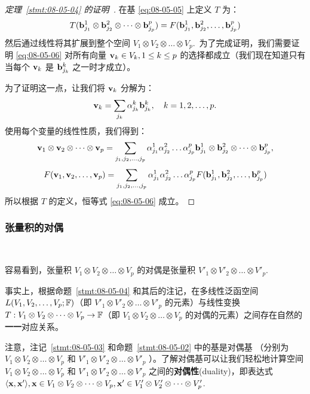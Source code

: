 \begin{proof}[\normalfont\heiti 定理~\ref{stmt:08-05-04} 的证明~\nopunct]
在基 \eqref{eq:08-05-05} 上定义 $T$ 为：
$$ T(\mathbf{b}^{1}_{j_1} \otimes \mathbf{b}^{2}_{j_2} \otimes \dots \otimes \mathbf{b}^{p}_{j_p}) = F(\mathbf{b}^{1}_{j_1}, \mathbf{b}^{2}_{j_2}, \dots, \mathbf{b}^{p}_{j_p}) $$
然后通过线性将其扩展到整个空间 $V_1 \otimes V_2 \otimes \dots \otimes V_p$.~为了完成证明，我们需要证明 \eqref{eq:08-05-06} 对所有向量 $\mathbf{v}_k \in V_k, 1 \le k \le p$ 的选择都成立（我们现在知道只有当每个 $\mathbf{v}_k$ 是 $\mathbf{b}^{k}_{j_k}$ 之一时才成立）。

为了证明这一点，让我们将 $\mathbf{v}_k$ 分解为：
$$ \mathbf{v}_k = \sum_{j_k} \alpha^{k}_{j_k} \mathbf{b}^{k}_{j_k}, \quad k = 1, 2, \dots, p .$$
使用每个变量的线性性质，我们得到：
$$ \mathbf{v}_1 \otimes \mathbf{v}_2 \otimes \dots \otimes \mathbf{v}_p = \sum_{j_1, j_2, \dots, j_p} \alpha^{1}_{j_1} \alpha^{2}_{j_2} \dots \alpha^{p}_{j_p} \mathbf{b}^{1}_{j_1} \otimes \mathbf{b}^{2}_{j_2} \otimes \dots \otimes \mathbf{b}^{p}_{j_p} ,$$
$$ F(\mathbf{v}_1, \mathbf{v}_2, \dots, \mathbf{v}_p) = \sum_{j_1, j_2, \dots, j_p} \alpha^{1}_{j_1} \alpha^{2}_{j_2} \dots \alpha^{p}_{j_p} F(\mathbf{b}^{1}_{j_1}, \mathbf{b}^{2}_{j_2}, \dots, \mathbf{b}^{p}_{j_p}) $$
所以根据 $T$ 的定义，恒等式 \eqref{eq:08-05-06} 成立。\end{proof}

\subsubsection{张量积的对偶}\label{sec:08-05-02-02}~~

容易看到，张量积 $V_1 \otimes V_2 \otimes \dots \otimes V_p$ 的对偶是张量积 $V'_1 \otimes V'_2 \otimes \dots \otimes V'_p$.

事实上，根据命题~\ref{stmt:08-05-04} 和其后的注记，在多线性泛函空间 $L(V_1,V_2,\dots,V_p;\mathbb{F})$（即 $V'_1 \otimes V'_2 \otimes \dots \otimes V'_p$ 的元素）与线性变换 $T : V_1 \otimes V_2 \otimes \dots \otimes V_p \to \mathbb{F}$（即 $V_1 \otimes V_2 \otimes \dots \otimes V_p$ 的对偶的元素）之间存在自然的\textbf{一一}对应关系。

注意，注记~\ref{stmt:08-05-03} 和命题~\ref{stmt:08-05-02} 中的基是对偶基 （分别为 $V_1 \otimes V_2 \otimes \dots \otimes V_p$ 和 $V'_1 \otimes V'_2 \otimes \dots \otimes V'_p$ ）。了解对偶基可以让我们轻松地计算空间 $V_1 \otimes V_2 \otimes \dots \otimes V_p$ 和 $V'_1 \otimes V'_2 \otimes \dots \otimes V'_p$ 之间的\textbf{对偶性}(duality)，即表达式 $\langle \mathbf{x}, \mathbf{x}' \rangle, \mathbf{x} \in V_1 \otimes V_2 \otimes \dots \otimes V_p, \mathbf{x}' \in V'_1 \otimes V'_2 \otimes \dots \otimes V'_p$.~

